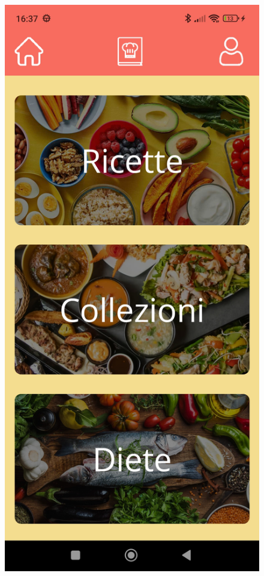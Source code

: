 ﻿\documentclass[a4paper,12pt]{report}
\begin{document}
\begin{figure}[h!]
    \begin{minipage}{.5\textwidth}
        \centering
        \includegraphics[width=0.9\linewidth]{app_images/BrowsePage.jpg}
    \end{minipage}
\end{figure}
\end{document}
